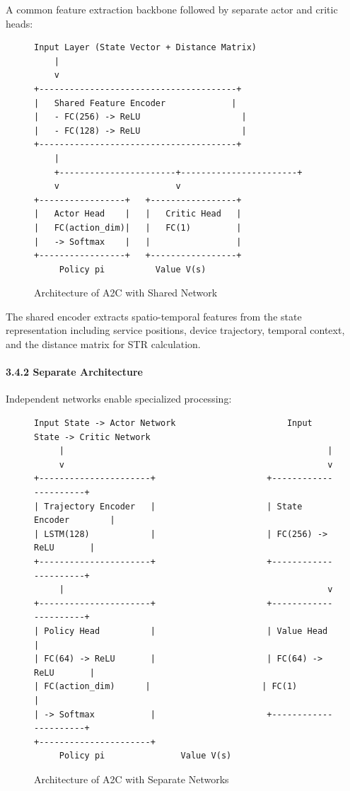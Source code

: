 A common feature extraction backbone followed by separate actor and
critic heads:

\begin{figure}[t]
	\centering
	\caption{Architecture of A2C with Shared Network}
	\label{shared-architecture-diagram}
	\small
	\begin{verbatim}
Input Layer (State Vector + Distance Matrix)
    |
    v
+---------------------------------------+
|   Shared Feature Encoder             |
|   - FC(256) -> ReLU                    |
|   - FC(128) -> ReLU                    |
+---------------------------------------+
    |
    +-----------------------+-----------------------+
    v                       v
+-----------------+   +-----------------+
|   Actor Head    |   |   Critic Head   |
|   FC(action_dim)|   |   FC(1)         |
|   -> Softmax    |   |                 |
+-----------------+   +-----------------+
     Policy pi          Value V(s)
	\end{verbatim}
\end{figure}

The shared encoder extracts spatio-temporal features from the state
representation including service positions, device trajectory, temporal
context, and the distance matrix for STR calculation.

\hypertarget{separate-architecture}{%
	\paragraph{3.4.2 Separate Architecture}\label{separate-architecture}}

Independent networks enable specialized processing:

\begin{figure}[t]
	\centering
	\caption{Architecture of A2C with Separate Networks}
	\label{separate-architecture-diagram}
	\small
	\begin{verbatim}
Input State -> Actor Network                      Input State -> Critic Network
     |                                                    |
     v                                                    v
+----------------------+                      +----------------------+
| Trajectory Encoder   |                      | State Encoder        |
| LSTM(128)            |                      | FC(256) -> ReLU       |
+----------------------+                      +----------------------+
     |                                                    v
+----------------------+                      +----------------------+
| Policy Head          |                      | Value Head           |
| FC(64) -> ReLU       |                      | FC(64) -> ReLU       |
| FC(action_dim)      |                      | FC(1)                |
| -> Softmax           |                      +----------------------+
+----------------------+
     Policy pi               Value V(s)
	\end{verbatim}
\end{figure}

